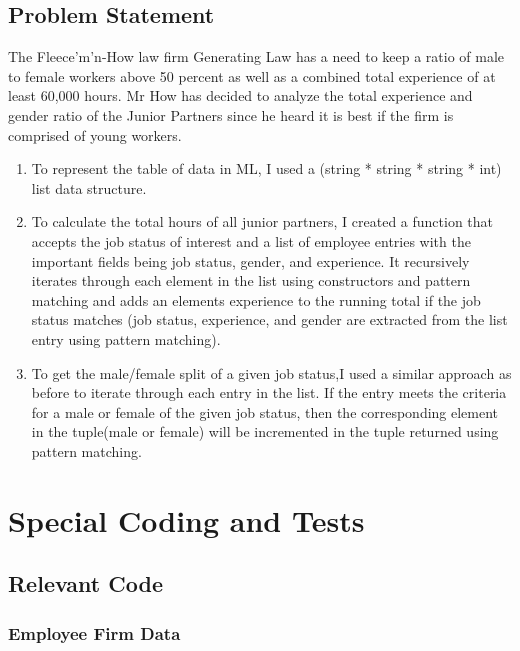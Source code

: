 \documentclass{report}
\begin{document}
\section{Problem Statement}
\label{sec:problem-statement}

The Fleece'm'n-How law firm Generating Law has a need to keep a ratio of 
male to female workers above 50 percent as well as a combined total experience of at least 60,000 hours. 
Mr How has decided to analyze the total experience and gender ratio of the Junior Partners since
he heard it is best if the firm is comprised of young workers. 

\begin{enumerate}
\item To represent the table of data in ML, I used a (string * string * string * int) list data structure.

\item To calculate the total hours of all junior partners, I created a function
that accepts the job status of interest and a list of employee entries with
the important fields being job status, gender, and experience. It recursively iterates through
each element in the list using constructors and pattern matching and adds an elements experience
to the running total if the job status matches (job status, experience, and gender are extracted
from the list entry using pattern matching).

\item To get the male/female split of a given job status,I used a similar approach as before to 
iterate through each entry in the list. If the entry meets the criteria for a male or female
of the given job status, then the corresponding element in the tuple(male or female) will
be incremented in the tuple returned using pattern matching.

\end{enumerate}


\chapter{Special Coding and Tests}
\label{cha:special-coding-tests}


\section{Relevant Code}
\label{sec:relevant-code}

\subsection{Employee Firm Data}
\label{sec:employee-firm-data}
\end{document}
